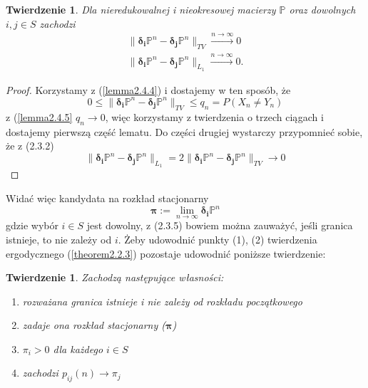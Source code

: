 \documentclass[a4paper]{article}
\theoremstyle{defn}
\theoremstyle{theorem}
\newtheorem{theorem}[defn]{Twierdzenie}
\theoremstyle{lemma}
\theoremstyle{cor}
\theoremstyle{fact}
\begin{document}
\begin{theorem}\label{theorem2.4.6}
Dla nieredukowalnej i nieokresowej macierzy $\mathbb{P}$ oraz dowolnych $i, j \in S$ zachodzi
\begin{align*}
\|\boldsymbol{\delta_i}\mathbb{P}^n - \boldsymbol{\delta_j}\mathbb{P}^n\|_{TV} \xrightarrow{n \to \infty} 0 \\
\|\boldsymbol{\delta_i}\mathbb{P}^n - \boldsymbol{\delta_j}\mathbb{P}^n\|_{L_1} \xrightarrow{n \to \infty} 0.
\end{align*}
\end{theorem}
\begin{proof}
Korzystamy z (\ref{lemma2.4.4}) i dostajemy w ten sposób, że $$0 \leq \|\boldsymbol{\delta_i}\mathbb{P}^n - \boldsymbol{\delta_j}\mathbb{P}^n\|_{TV} \leq q_n = P(X_n \neq Y_n)$$
z (\ref{lemma2.4.5} $q_n \to 0$, więc korzystamy z twierdzenia o trzech ciągach i dostajemy pierwszą część lematu. Do części drugiej wystarczy przypomnieć sobie, że z (2.3.2) $$\|\boldsymbol{\delta_i}\mathbb{P}^n - \boldsymbol{\delta_j}\mathbb{P}^n\|_{L_1} = 2\|\boldsymbol{\delta_i}\mathbb{P}^n - \boldsymbol{\delta_j}\mathbb{P}^n\|_{TV} \to 0$$
\end{proof}
Widać więc kandydata na rozkład stacjonarny $$\boldsymbol{\pi} := \lim\limits_{n \to \infty} \boldsymbol{\delta_i}\mathbb{P}^n$$ gdzie wybór $i \in S$ jest dowolny, z (2.3.5) bowiem można zauważyć, jeśli granica istnieje, to nie zależy od $i$. Żeby udowodnić punkty (1), (2) twierdzenia ergodycznego (\ref{theorem2.2.3}) pozostaje udowodnić poniższe twierdzenie:
\begin{theorem}\label{theorem2.4.7}
Zachodzą następujące własności:
\begin{enumerate}
	\item[(a)] rozważana granica istnieje i nie zależy od rozkładu początkowego
	\item[(b)] zadaje ona rozkład stacjonarny ($\boldsymbol{\pi}$)
	\item[(c)] $\pi_i > 0$ dla każdego $i \in S$
	\item[(d)] zachodzi $p_{ij}(n) \to \pi_j$
\end{enumerate}
\end{theorem}
\end{document}
